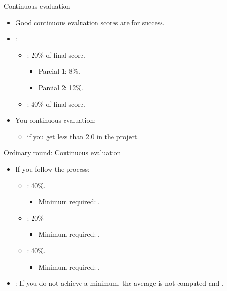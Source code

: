 \begin{frame}[t]{Continuous evaluation}
\begin{itemize}
  \item Good continuous evaluation scores are  for success.

  \item {}:
    \begin{itemize}
      \item {}: 20\% of final score.
        \begin{itemize}
          \item Parcial 1: 8\%.
          \item Parcial 2: 12\%.
        \end{itemize}
      \item {}: 40\% of final score.
    \end{itemize}
  \vspace{1em}

  \item You  continuous evaluation:
    \begin{itemize}
      \item if you get less than 2.0 in the project.
    \end{itemize}
\end{itemize}
\end{frame}

\begin{frame}[t]{Ordinary round: Continuous evaluation}
\begin{itemize}
  \item If you follow the  process:
    \begin{itemize}
      \item {}: 40\%.
        \begin{itemize}
          \item Minimum required: .
        \end{itemize}
      \item {}: 20\%
        \begin{itemize}
          \item Minimum required: .
        \end{itemize}
      \item {}: 40\%.
        \begin{itemize}
          \item Minimum required: .
        \end{itemize}
    \end{itemize}

    \item {}: If you do not achieve a minimum, the average is not computed and 
        .
\end{itemize}
\end{frame}


